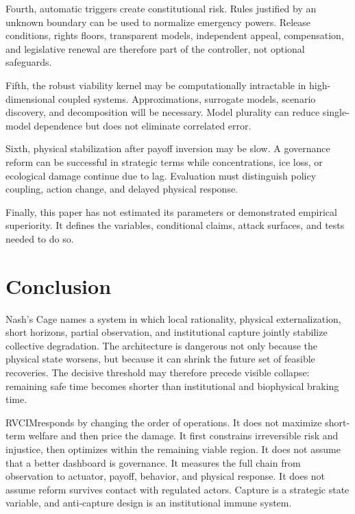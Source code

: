 \documentclass[11pt,a4paper]{article}
\numberwithin{equation}{section}
\theoremstyle{definition}
\theoremstyle{plain}
\theoremstyle{remark}
\newcommand{\RVCIM}{\textsc{RVCIM}}
\begin{document}
Fourth, automatic triggers create constitutional risk. Rules justified by an unknown boundary can be used to normalize emergency powers. Release conditions, rights floors, transparent models, independent appeal, compensation, and legislative renewal are therefore part of the controller, not optional safeguards.

Fifth, the robust viability kernel may be computationally intractable in high-dimensional coupled systems. Approximations, surrogate models, scenario discovery, and decomposition will be necessary. Model plurality can reduce single-model dependence but does not eliminate correlated error.

Sixth, physical stabilization after payoff inversion may be slow. A governance reform can be successful in strategic terms while concentrations, ice loss, or ecological damage continue due to lag. Evaluation must distinguish policy coupling, action change, and delayed physical response.

Finally, this paper has not estimated its parameters or demonstrated empirical superiority. It defines the variables, conditional claims, attack surfaces, and tests needed to do so.

\section{Conclusion}

Nash's Cage names a system in which local rationality, physical externalization, short horizons, partial observation, and institutional capture jointly stabilize collective degradation. The architecture is dangerous not only because the physical state worsens, but because it can shrink the future set of feasible recoveries. The decisive threshold may therefore precede visible collapse: remaining safe time becomes shorter than institutional and biophysical braking time.

\RVCIM responds by changing the order of operations. It does not maximize short-term welfare and then price the damage. It first constrains irreversible risk and injustice, then optimizes within the remaining viable region. It does not assume that a better dashboard is governance. It measures the full chain from observation to actuator, payoff, behavior, and physical response. It does not assume reform survives contact with regulated actors. Capture is a strategic state variable, and anti-capture design is an institutional immune system.
\end{document}
